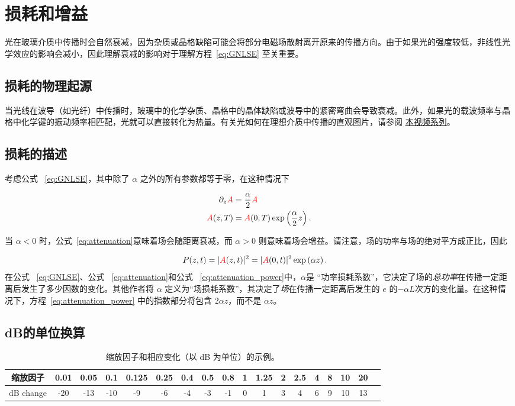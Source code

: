 \chapter{损耗和增益}
\label{ch:attenuation}


光在玻璃介质中传播时会自然衰减，因为杂质或晶格缺陷可能会将部分电磁场散射离开原来的传播方向。由于如果光的强度较低，非线性光学效应的影响会减小，因此理解衰减的影响对于理解方程~\ref{eq:GNLSE} 至关重要。


\section{损耗的物理起源}
当光线在波导（如光纤）中传播时，玻璃中的化学杂质、晶格中的晶体缺陷或波导中的紧密弯曲会导致衰减。此外，如果光的载波频率与晶格中化学键的振动频率相匹配，光就可以直接转化为热量。有关光如何在理想介质中传播的直观图片，请参阅 \href{https://www.youtube.com/watch?v=QCX62YJCmGk&list=PLZHQObOWTQDMKqfyUvG2kTlYt-QQ2x-ui}{本视频系列}。


\section{损耗的描述}

考虑公式 ~\ref{eq:GNLSE}，其中除了 $\alpha$ 之外的所有参数都等于零，在这种情况下

\begin{align}
    \label{eq:attenuation}
    \partial_z\textcolor{red}{A} &= \frac{\alpha}{2} \textcolor{red}{A} \\ \nonumber
    \textcolor{red}{A}(z,T)&=\textcolor{red}{A}(0,T)\exp\left( \frac{\alpha}{2}z \right). 
\end{align}

当 $\alpha<0$ 时，公式~\ref{eq:attenuation}意味着场会随距离衰减，而 $\alpha>0$ 则意味着场会增益。请注意，场的功率与场的绝对平方成正比，因此

\begin{align}
    \label{eq:attenuation_power}
    P(z,t)=|\textcolor{red}{A}(z,t)|^2&=|\textcolor{red}{A}(0,t)|^2 \exp\left( \alpha z \right). 
\end{align}
在公式 ~\ref{eq:GNLSE}、公式 ~\ref{eq:attenuation}和公式 ~\ref{eq:attenuation_power}中，$\alpha$是 “功率损耗系数”，它决定了场的\emph{总功率}在传播一定距离后发生了多少因数的变化。其他作者将 $\alpha$ 定义为“场损耗系数”，其决定了\emph{场}在传播一定距离后发生的 $e$ 的$-\alpha L$次方的变化量。在这种情况下，方程~\ref{eq:attenuation_power} 中的指数部分将包含 $2\alpha z$，而不是 $\alpha z$。

\section{dB的单位换算}
\begin{table}[]
    \centering
    \begin{tabular}{ c|c|c|c|c|c|c|c|c|c|c|c|c|c|c|c|c|c }
\label{tab:dB}
 缩放因子 &0.01&0.05 & 0.1 &0.125 &0.25&0.4 &0.5 & 0.8&1&1.25 &2 &2.5 &4 &8 &10 &20 & \\  \hline
 dB change & -20 &-13 &-10 & -9&  -6&-4& -3&-1&0&1 &3 &4 &6 &9 & 10&13 
\end{tabular}
    \caption{缩放因子和相应变化（以 dB 为单位）的示例。}
    \label{tab:dB}
\end{table}

